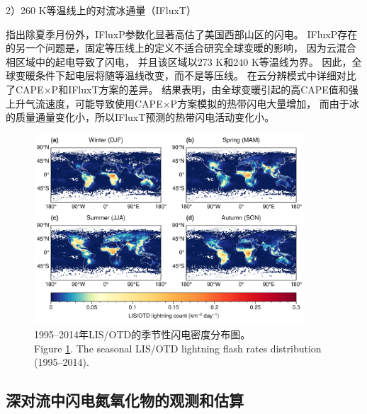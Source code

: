 2）260 K等温线上的对流冰通量（IFluxT）

\citet{Romps.2019}指出除夏季月份外，IFluxP参数化显著高估了美国西部山区的闪电。
IFluxP存在的另一个问题是，固定等压线上的定义不适合研究全球变暖的影响，
因为云混合相区域中的起电导致了闪电\citep{Williams.1991}，
并且该区域以273 K和240 K等温线为界。
因此，全球变暖条件下起电层将随等温线改变，而不是等压线。
\citet{Romps.2019}在云分辨模式中详细对比了CAPE$\times$P和IFluxT方案的差异。
结果表明，由全球变暖引起的高CAPE值和强上升气流速度，可能导致使用CAPE$\times$P方案模拟的热带闪电大量增加，
而由于冰的质量通量变化小，所以IFluxT预测的热带闪电活动变化小。

\begin{figure}[H]
\centering
\includegraphics[width=0.9\textwidth]{./figures/lisotd_season.png}
\caption{1995--2014年LIS/OTD的季节性闪电密度分布图。\\
Figure \ref{fig:lisotd_season}. The seasonal LIS/OTD lightning flash rates distribution (1995--2014).
}
\label{fig:lisotd_season}
\end{figure}

\subsection{深对流中闪电氮氧化物的观测和估算} \label{sec:intro_lnox}

